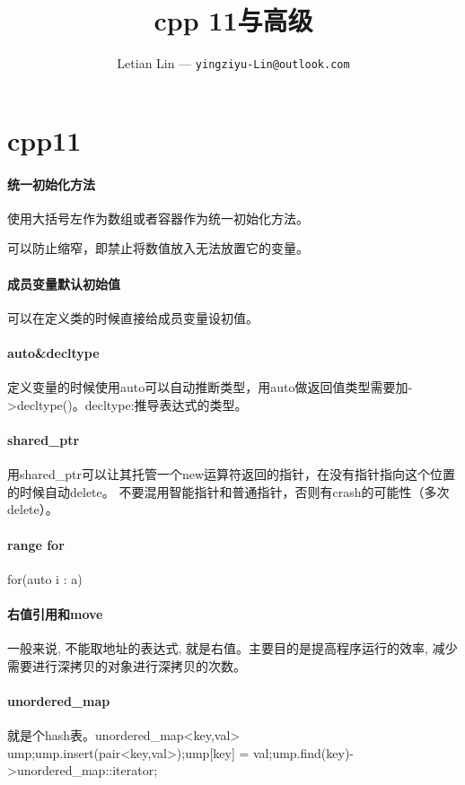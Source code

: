 \documentclass[UTF8]{ctexart}
\title{
	cpp 11与高级
}
\author{
	Letian Lin --- \texttt{yingziyu-Lin@outlook.com}
}
\begin{document}
\maketitle
\section{cpp11}
\paragraph{统一初始化方法}使用大括号左作为数组或者容器作为统一初始化方法。

可以防止缩窄，即禁止将数值放入无法放置它的变量。

\paragraph{成员变量默认初始值}
可以在定义类的时候直接给成员变量设初值。

\paragraph{auto\&decltype}定义变量的时候使用auto可以自动推断类型，用auto做返回值类型需要加->decltype()。decltype:推导表达式的类型。

\paragraph{shared_ptr}用shared_ptr可以让其托管一个new运算符返回的指针，在没有指针指向这个位置的时候自动delete。
不要混用智能指针和普通指针，否则有crash的可能性（多次delete）。

\paragraph{range for}for(auto i : a)

\paragraph{右值引用和move}一般来说, 不能取地址的表达式, 就是右值。主要目的是提高程序运行的效率, 减少需要进行深拷贝的对象进行深拷贝的次数。

\paragraph{unordered_map}就是个hash表。unordered_map<key,val> ump;ump.insert(pair<key,val>);ump[key] = val;ump.find(key)->unordered_map::iterator;
\end{document}

